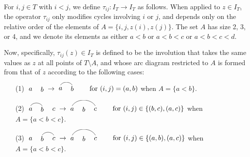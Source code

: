 \documentclass[10pt]{article}
\begin{document}
\begin{definition}
\label{D: tau}
For $i,j \in T$ with $i<j$, 
we define $\tau_{ij}:I_T\to I_T$ as follows. 
When applied to $z \in I_T$, the operator $\tau_{ij}$ only modifies cycles
involving $i$ or $j$, and depends only on
the relative order of the elements of $A=\{i,j,z(i),z(j)\}$. The set $A$
has size 2, 3, or 4, and we denote its elements as either $a<b$ or $a<b<c$ or $a<b<c<d$. 

Now, specifically, $\tau_{ij}(z) \in I_T$ is defined to be the involution that takes the same values as $z$ at all points of $T\setminus A$,
and whose arc diagram restricted to $A$ is formed 
from that of $z$ according to the following cases:
\begin{itemize}
\item[(1)] 
$
\begin{tikzpicture}[baseline=-2pt,scale=0.6]
\node at (0,0) {$a$};
\node at (1,0) {$b$};
\end{tikzpicture}
\rightarrow
\begin{tikzpicture}[baseline=-3pt,scale=0.6]
\node at (0,0)  {$a$};
\node at (1,0)  {$b$};
\draw [transform canvas={yshift=5pt}] (0,0) to[out=60,in=120] (1,0);
\end{tikzpicture}
\qquad\text{for }(i,j)=(a,b)$ when $A=\{a<b\}$.

\item[(2)]
$
\begin{tikzpicture}[baseline=-2pt,scale=0.6]
\node at (0,0) {$a$};
\node at (1,0) {$b$};
\node at (2,0) {$c$};
\draw [transform canvas={yshift=5pt}] (0,0) to[out=60,in=120] (1,0);
\end{tikzpicture}
\rightarrow
\begin{tikzpicture}[baseline=-2pt,scale=0.6]
\node at (0,0) {$a$};
\node at (1,0) {$b$};
\node at (2,0) {$c$};
\draw [transform canvas={yshift=5pt}] (0,0) to[out=60,in=120] (2,0);
\end{tikzpicture}
\qquad\text{for }(i,j)\in\{(b,c),(a,c)\}$ when $A=\{a<b<c\}$.

\item[(3)]
$
\begin{tikzpicture}[baseline=-2pt,scale=0.6]
\node at (0,0) {$a$};
\node at (1,0) {$b$};
\node at (2,0) {$c$};
\draw [transform canvas={yshift=5pt}] (1,0) to[out=60,in=120] (2,0);
\end{tikzpicture}
\rightarrow
\begin{tikzpicture}[baseline=-2pt,scale=0.6]
\node at (0,0) {$a$};
\node at (1,0) {$b$};
\node at (2,0) {$c$};
\draw [transform canvas={yshift=5pt}] (0,0) to[out=60,in=120] (2,0);
\end{tikzpicture}
\qquad\text{for }(i,j)\in\{(a,b),(a,c)\}$ when $A=\{a<b<c\}$.


\end{itemize}
\end{definition}
\end{document}
